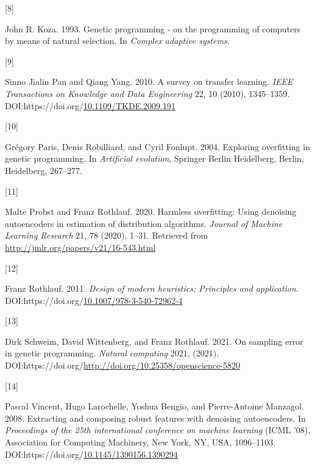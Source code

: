 \documentclass[
  11pt,
]{article}
\newlength{\cslhangindent}
\newlength{\csllabelwidth}
\newlength{\cslentryspacingunit} %
\newenvironment{CSLReferences}[2] %
 {%
  \setlength{\parindent}{0pt}
  \ifodd #1
  \let\oldpar\par
  \def\par{\hangindent=\cslhangindent\oldpar}
  \fi
  \setlength{\parskip}{#2\cslentryspacingunit}
 }%
 {}
\newcommand{\CSLLeftMargin}[1]{\parbox[t]{\csllabelwidth}{#1}}
\newcommand{\CSLRightInline}[1]{\parbox[t]{\linewidth - \csllabelwidth}{#1}\break}
\begin{document}
\begin{CSLReferences}{0}{0}
\leavevmode{}%
\CSLLeftMargin{{[}8{]} }%
\CSLRightInline{John R. Koza. 1993. Genetic programming - on the
programming of computers by means of natural selection. In \emph{Complex
adaptive systems}.}

\leavevmode{}%
\CSLLeftMargin{{[}9{]} }%
\CSLRightInline{Sinno Jialin Pan and Qiang Yang. 2010. A survey on
transfer learning. \emph{IEEE Transactions on Knowledge and Data
Engineering} 22, 10 (2010), 1345--1359.
DOI:https://doi.org/\href{https://doi.org/10.1109/TKDE.2009.191}{10.1109/TKDE.2009.191}}

\leavevmode{}%
\CSLLeftMargin{{[}10{]} }%
\CSLRightInline{Grégory Paris, Denis Robilliard, and Cyril Fonlupt.
2004. Exploring overfitting in genetic programming. In \emph{Artificial
evolution}, Springer Berlin Heidelberg, Berlin, Heidelberg, 267--277.}

\leavevmode{}%
\CSLLeftMargin{{[}11{]} }%
\CSLRightInline{Malte Probst and Franz Rothlauf. 2020. Harmless
overfitting: Using denoising autoencoders in estimation of distribution
algorithms. \emph{Journal of Machine Learning Research} 21, 78 (2020),
1--31. Retrieved from \url{http://jmlr.org/papers/v21/16-543.html}}

\leavevmode{}%
\CSLLeftMargin{{[}12{]} }%
\CSLRightInline{Franz Rothlauf. 2011. \emph{Design of modern heuristics:
Principles and application}.
DOI:https://doi.org/\href{https://doi.org/10.1007/978-3-540-72962-4}{10.1007/978-3-540-72962-4}}

\leavevmode{}%
\CSLLeftMargin{{[}13{]} }%
\CSLRightInline{Dirk Schweim, David Wittenberg, and Franz Rothlauf.
2021. On sampling error in genetic programming. \emph{Natural computing}
2021, (2021).
DOI:https://doi.org/\url{http://doi.org/10.25358/openscience-5820}}

\leavevmode{}%
\CSLLeftMargin{{[}14{]} }%
\CSLRightInline{Pascal Vincent, Hugo Larochelle, Yoshua Bengio, and
Pierre-Antoine Manzagol. 2008. Extracting and composing robust features
with denoising autoencoders. In \emph{Proceedings of the 25th
international conference on machine learning} (ICML '08), Association
for Computing Machinery, New York, NY, USA, 1096--1103.
DOI:https://doi.org/\href{https://doi.org/10.1145/1390156.1390294}{10.1145/1390156.1390294}}


\end{CSLReferences}
\end{document}
